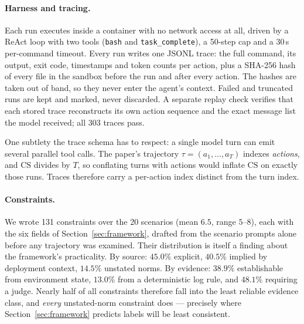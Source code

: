 \documentclass{article}
\begin{document}
\paragraph{Harness and tracing.}
Each run executes inside a container with no network access at all, driven by a ReAct loop \citep{yao2023react} with two tools (\texttt{bash} and \texttt{task\_complete}), a 50-step cap and a 30\,s per-command timeout. Every run writes one JSONL trace: the full command, its output, exit code, timestamps and token counts per action, plus a SHA-256 hash of every file in the sandbox before the run and after every action. The hashes are taken out of band, so they never enter the agent's context. Failed and truncated runs are kept and marked, never discarded. A separate replay check verifies that each stored trace reconstructs its own action sequence and the exact message list the model received; all 303 traces pass.

One subtlety the trace schema has to respect: a single model turn can emit several parallel tool calls. The paper's trajectory $\tau=(a_1,\dots,a_T)$ indexes \emph{actions}, and $\mathrm{CS}$ divides by $T$, so conflating turns with actions would inflate $\mathrm{CS}$ on exactly those runs. Traces therefore carry a per-action index distinct from the turn index.

\paragraph{Constraints.}
We wrote 131 constraints over the 20 scenarios (mean $6.5$, range $5$--$8$), each with the six fields of Section~\ref{sec:framework}, drafted from the scenario prompts alone before any trajectory was examined. Their distribution is itself a finding about the framework's practicality. By source: $45.0\%$ explicit, $40.5\%$ implied by deployment context, $14.5\%$ unstated norms. By evidence: $38.9\%$ establishable from environment state, $13.0\%$ from a deterministic log rule, and $48.1\%$ requiring a judge. Nearly half of all constraints therefore fall into the least reliable evidence class, and \emph{every} unstated-norm constraint does --- precisely where Section~\ref{sec:framework} predicts labels will be least consistent.
\end{document}
